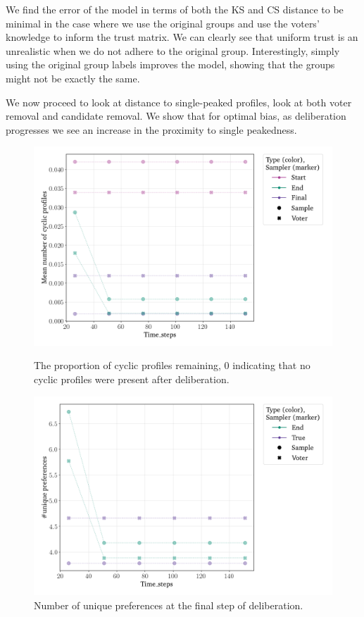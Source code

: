 We find the error of the model in terms of both the KS and CS distance to be minimal in the case where we use the original groups and use the voters' knowledge to inform the trust matrix. We can clearly see that uniform trust is an unrealistic when we do not adhere to the original group. Interestingly, simply using the original group labels improves the model, showing that the groups might not be exactly the same.

We now proceed to look at distance to single-peaked profiles, look at both
voter removal and candidate removal. We show that for optimal bias, as
deliberation progresses we see an increase in the proximity to single
peakedness.


\begin{figure}[htbp]
	\centering
	\begin{minipage}{0.45\textwidth}
		\centering
		\includegraphics[width=\textwidth]{Figures/delib_Mean Number of Cyclic Profiles.png}
		\caption{The proportion of cyclic profiles remaining, 0 indicating that no cyclic profiles were present after deliberation.}
		\label{fig:degroot_cyclic}
	\end{minipage}\hfill
	\begin{minipage}{0.45\textwidth}
		\centering
		\vspace{-9pt}
		\includegraphics[width=\textwidth]{Figures/delib_number_Unique Preferences.png}
		\caption{Number of unique preferences at the final step of deliberation.}
		\label{fig:degroot_count}
	\end{minipage}


\end{figure}
